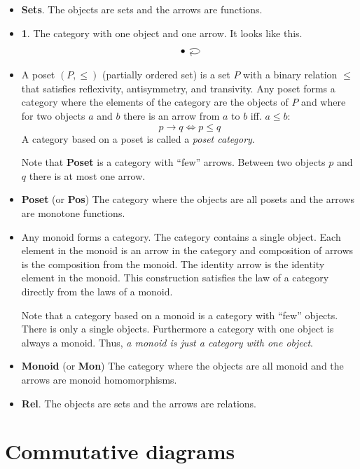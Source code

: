 \documentclass{book}
\theoremstyle{definition}
\begin{document}
\begin{itemize}
  \item \textbf{Sets}. The objects are sets and the arrows are functions.
  \item \textbf{1}. The category with one object and one arrow. It looks like this.
    \[
      \begin{tikzcd}
        \bullet \arrow[loop right]
      \end{tikzcd}
    \]
  \item A poset $(P, \leq)$ (partially ordered set) is a set $P$ with a binary
    relation $\leq$ that satisfies reflexivity, antisymmetry, and transivity.
    Any poset forms a category where the elements of the category are the
    objects of $P$ and where for two objects $a$ and $b$ there is an arrow from
    $a$ to $b$ iff. $a \leq b$:
    \[
      p \rightarrow q \iff p \leq q
    \]
    A category based on a poset is called a \emph{poset category}.

    Note that \textbf{Poset} is a category with ``few'' arrows. Between two
    objects $p$ and $q$ there is at most one arrow.

  \item \textbf{Poset} (or \textbf{Pos}) The category where the objects are all
    posets and the arrows are monotone functions.

  \item Any monoid forms a category. The category contains a single object. Each
    element in the monoid is an arrow in the category and composition of arrows
    is the composition from the monoid. The identity arrow is the identity
    element in the monoid. This construction satisfies the law of a category
    directly from the laws of a monoid.

    Note that a category based on a monoid is a category with ``few'' objects.
    There is only a single objects. Furthermore a category with one object is
    always a monoid. Thus, \emph{a monoid is just a category with one object}.

  \item \textbf{Monoid} (or \textbf{Mon}) The category where the objects are all
    monoid and the arrows are monoid homomorphisms.

  \item \textbf{Rel}. The objects are sets and the arrows are relations.
\end{itemize}

\section{Commutative diagrams}
\end{document}
